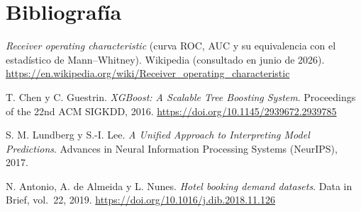 \documentclass[10pt,twocolumn,a4paper]{article}
\begin{document}
\section*{Bibliografía}
\small
\begin{enumerate}[label={[\arabic*]}, leftmargin=2.2em]
  \item \emph{Receiver operating characteristic} (curva ROC, AUC y su equivalencia con
        el estadístico de Mann--Whitney). Wikipedia (consultado en junio de 2026).
        \url{https://en.wikipedia.org/wiki/Receiver_operating_characteristic}
  \item T. Chen y C. Guestrin. \emph{XGBoost: A Scalable Tree Boosting System}.
        Proceedings of the 22nd ACM SIGKDD, 2016.
        \url{https://doi.org/10.1145/2939672.2939785}
  \item S. M. Lundberg y S.-I. Lee. \emph{A Unified Approach to Interpreting Model
        Predictions}. Advances in Neural Information Processing Systems (NeurIPS), 2017.
  \item N. Antonio, A. de Almeida y L. Nunes. \emph{Hotel booking demand datasets}.
        Data in Brief, vol.\ 22, 2019. \url{https://doi.org/10.1016/j.dib.2018.11.126}
\end{enumerate}
\end{document}
